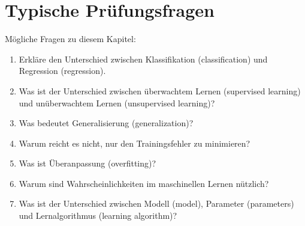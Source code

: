 \section{Typische Prüfungsfragen}

\begin{examtipbox}
Mögliche Fragen zu diesem Kapitel:

\begin{enumerate}
    \item Erkläre den Unterschied zwischen Klassifikation (classification) und Regression (regression).
    \item Was ist der Unterschied zwischen überwachtem Lernen (supervised learning) und unüberwachtem Lernen (unsupervised learning)?
    \item Was bedeutet Generalisierung (generalization)?
    \item Warum reicht es nicht, nur den Trainingsfehler zu minimieren?
    \item Was ist Überanpassung (overfitting)?
    \item Warum sind Wahrscheinlichkeiten im maschinellen Lernen nützlich?
    \item Was ist der Unterschied zwischen Modell (model), Parameter (parameters) und Lernalgorithmus (learning algorithm)?
\end{enumerate}
\end{examtipbox}